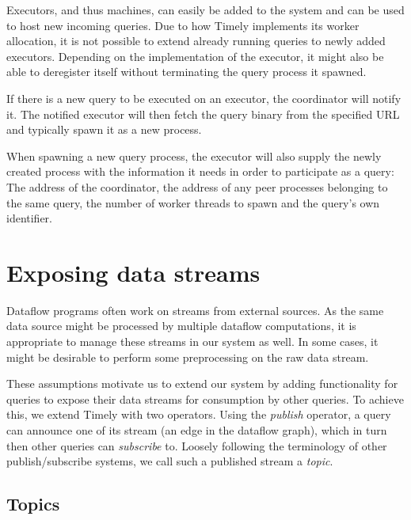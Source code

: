 
Executors, and thus machines, can easily be added to the system and can be used
to host new incoming queries. Due to how Timely implements its worker allocation,
it is not possible to extend already running queries to newly added executors.
Depending on the implementation of the executor, it might also be able to
deregister itself without terminating the query process it spawned.

If there is a new query to be executed on an executor, the coordinator will notify
it. The notified executor will then fetch the query binary from the specified URL
and typically spawn it as a new process.

When spawning a new query process, the executor will also supply the newly created
process with the information it needs in order to participate as a query:
The address of the coordinator, the address of any peer processes belonging to the 
same query, the number of worker threads to spawn and the query's own identifier.

\section{Exposing data streams}

Dataflow programs often work on streams from external sources. As the same
data source might be processed by multiple dataflow computations, it is
appropriate to manage these streams in our system as well. In some cases, it
might be desirable to perform some preprocessing on the raw data stream.

These assumptions motivate us to extend our system by adding functionality
for queries to expose their data streams for consumption by other queries. To
achieve this, we extend Timely with two operators. Using the \emph{publish}
operator, a query can announce one of its stream (an edge in the dataflow graph),
which in turn then other queries can \emph{subscribe} to.
Loosely following the terminology of other publish/subscribe
systems, we call such a published stream a \emph{topic}.

\subsection{Topics}

